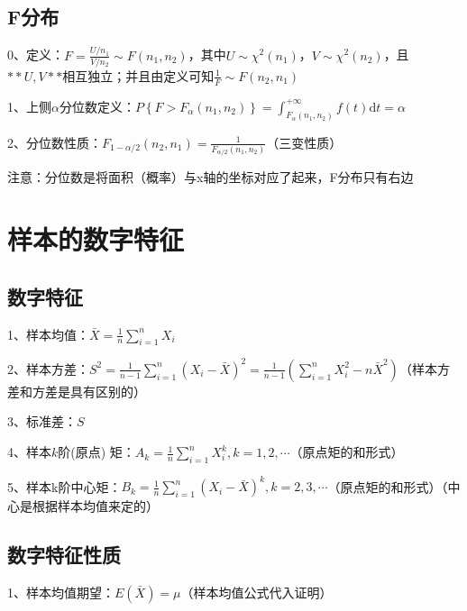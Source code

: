 \subsection{F分布}

0、定义：$ F=\frac{U / n_{1}}{V / n_{2}} \sim F\left(n_{1}, n_{2}\right) $，其中$ U \sim \chi^{2}\left(n_{1}\right) $，$  V \sim \chi^{2}\left(n_{2}\right) $，且$ **U,V** $相互独立；并且由定义可知$ \frac{1}{F} \sim F\left(n_{2}, n_{1}\right) $

1、上侧$ \alpha $分位数定义：$ P\left\{F>F_{\alpha}\left(n_{1}, n_{2}\right)\right\}=\int_{F_{\alpha}\left(n_{1}, n_{2}\right)}^{+\infty} f(t) \mathrm{d} t=\alpha $

2、分位数性质：$ F_{1-\alpha/2}(n_{2},n_{1})=\frac{1}{F_{{\alpha}/{2}}\left(n_{1}, n_{2}\right)} $（三变性质）

注意：分位数是将面积（概率）与x轴的坐标对应了起来，F分布只有右边

\section{样本的数字特征}



\subsection{数字特征}

1、样本均值：$ \bar{X}=\frac{1}{n} \sum_{i=1}^{n} X_{i} $

2、样本方差：$ S^{2}=\frac{1}{n-1} \sum_{i=1}^{n}\left(X_{i}-\bar{X}\right)^{2}=\frac{1}{n-1}\left(\sum_{i=1}^{n} X_{i}^{2}-n \bar{X}^{2}\right) $（样本方差和方差是具有区别的）

3、标准差：$ S $

4、样本$ k $阶(原点) 矩：$ A_{k}=\frac{1}{n} \sum_{i=1}^{n} X_{i}^{k}, k=1,2, \cdots $（原点矩的和形式）

5、样本k阶中心矩：$ B_{k}=\frac{1}{n} \sum_{i=1}^{n}\left(X_{i}-\bar{X}\right)^{k}, k=2,3, \cdots $（原点矩的和形式）（中心是根据样本均值来定的）



\subsection{数字特征性质}

1、样本均值期望：$ E(\bar{X}) = \mu $（样本均值公式代入证明）

